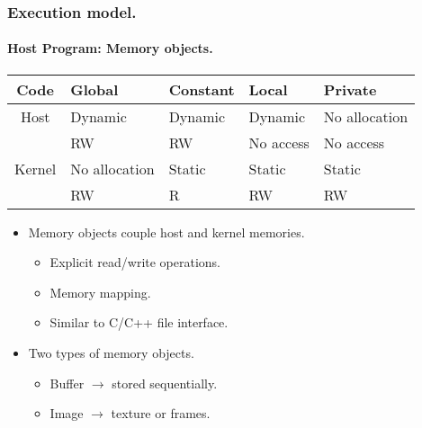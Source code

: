 \documentclass{beamer}
\newcommand{\tablefont}{\fontsize{8}{13}\selectfont}
\begin{document}
\begin{frame}[fragile]
\frametitle{Execution model.}
\framesubtitle{Host Program: Memory objects.}
  
  \tablefont
  \begin{center}
  \begin{tabular}{|c|l|l|l|l|}
  \hline
  Code & Global & Constant & Local & Private \\
  \hline
  Host & Dynamic & Dynamic & Dynamic & No allocation \\
       & RW & RW & No access & No access \\
  \hline
  Kernel & No allocation & Static & Static & Static \\
         & RW & R & RW & RW \\
  \hline
  \end{tabular}
  \end{center}

  \normalsize 
  \begin{itemize}
  \item Memory objects couple host and kernel memories.
    \begin{itemize}
    \item Explicit read/write operations.
    \item Memory mapping.
    \item Similar to C/C++ file interface.
    \end{itemize}
  \item Two types of memory objects.
    \begin{itemize}
    \item Buffer $\rightarrow{}$ stored sequentially.
    \item Image $\rightarrow{}$ texture or frames.
    \end{itemize} 
  \end{itemize}

\end{frame}
\end{document}
